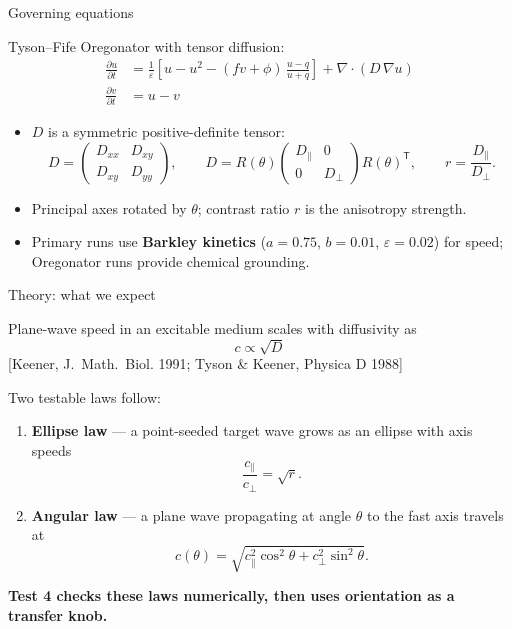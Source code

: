 \documentclass[aspectratio=169,11pt]{beamer}
\newcommand{\citeslide}[1]{\hfill{\footnotesize [#1]}}
\begin{document}
\begin{frame}{Governing equations}

Tyson--Fife Oregonator with tensor diffusion:
\begin{align*}
    \frac{\partial u}{\partial t} &= \frac{1}{\varepsilon}\left[ u - u^2 - (f v + \phi)\,\frac{u-q}{u+q} \right] + \nabla \cdot \left( D\, \nabla u \right) \\
    \frac{\partial v}{\partial t} &= u - v
\end{align*}

\vspace{0.2cm}
\begin{itemize}
    \item $D$ is a symmetric positive-definite tensor:
    \[
        D = \begin{pmatrix} D_{xx} & D_{xy} \\ D_{xy} & D_{yy} \end{pmatrix},
        \qquad
        D = R(\theta)
        \begin{pmatrix} D_\parallel & 0 \\ 0 & D_\perp \end{pmatrix}
        R(\theta)^{\mathsf T},
        \qquad r = \frac{D_\parallel}{D_\perp}.
    \]
    \item Principal axes rotated by $\theta$; contrast ratio $r$ is the anisotropy strength.
    \item Primary runs use \textbf{Barkley kinetics} ($a = 0.75$, $b = 0.01$, $\varepsilon = 0.02$) for speed; Oregonator runs provide chemical grounding.
\end{itemize}

\end{frame}

\begin{frame}{Theory: what we expect}

Plane-wave speed in an excitable medium scales with diffusivity as
\[
    c \propto \sqrt{D}
\]
\citeslide{Keener, J.~Math.~Biol. 1991; Tyson \& Keener, Physica D 1988}

\vspace{0.3cm}
Two testable laws follow:

\begin{enumerate}
    \item \textbf{Ellipse law} --- a point-seeded target wave grows as an ellipse with axis speeds
    \[
        \frac{c_\parallel}{c_\perp} = \sqrt{r}.
    \]
    \item \textbf{Angular law} --- a plane wave propagating at angle $\theta$ to the fast axis travels at
    \[
        c(\theta) = \sqrt{c_\parallel^2 \cos^2\theta + c_\perp^2 \sin^2\theta}.
    \]
\end{enumerate}

\vspace{0.2cm}
\centering
\textbf{Test 4 checks these laws numerically, then uses orientation as a transfer knob.}

\end{frame}
\end{document}
